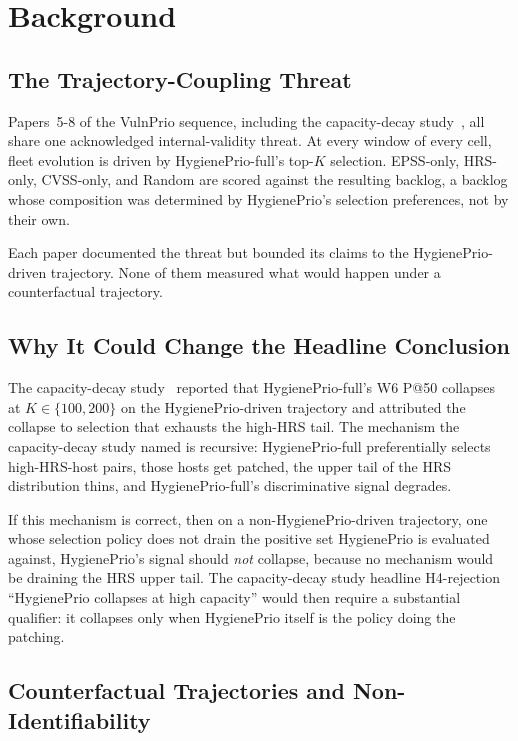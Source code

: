 \section{Background}

\subsection{The Trajectory-Coupling Threat}

Papers~5-8 of the VulnPrio sequence, including the capacity-decay study~\cite{paper6capacity},
all share one acknowledged internal-validity threat. At every window of
every cell, fleet evolution is driven by HygienePrio-full's
top-$K$ selection. EPSS-only, HRS-only, CVSS-only, and Random are scored
against the resulting backlog, a backlog whose composition was
determined by HygienePrio's selection preferences, not by their own.

Each paper documented the threat but bounded its claims to the
HygienePrio-driven trajectory. None of them measured what would happen
under a counterfactual trajectory.

\subsection{Why It Could Change the Headline Conclusion}

The capacity-decay study~\cite{paper6capacity} reported that HygienePrio-full's W6 P@50
collapses at $K \in \{100, 200\}$ on the HygienePrio-driven trajectory
and attributed the collapse to selection that exhausts the high-HRS
tail. The
mechanism the capacity-decay study named is recursive: HygienePrio-full preferentially
selects high-HRS-host pairs, those hosts get patched, the upper tail of
the HRS distribution thins, and HygienePrio-full's discriminative
signal degrades.

If this mechanism is correct, then on a non-HygienePrio-driven
trajectory, one whose selection policy does not drain the positive
set HygienePrio is evaluated against, 
HygienePrio's signal should \textit{not} collapse, because no
mechanism would be draining the HRS upper tail. The capacity-decay study headline
H4-rejection ``HygienePrio collapses at high capacity'' would then
require a substantial qualifier: it collapses only when HygienePrio
itself is the policy doing the patching.

\subsection{Counterfactual Trajectories and Non-Identifiability}

